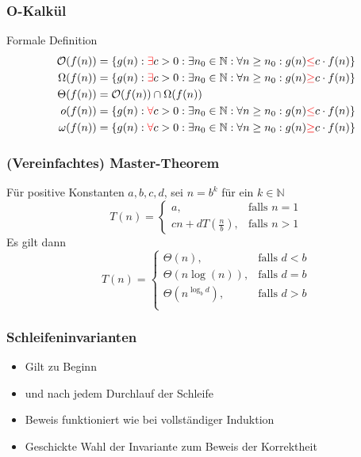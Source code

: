 \begin{frame}
	\frametitle{O-Kalkül}
	\begin{block}{Formale Definition}
		\begin{align*}
			\mathcal{O}(f(n)) &= \{g(n):{\color{red}\exists} c > 0: \exists n_0 \in \mathbb{N}: \forall n \ge n_0: g(n) {\color{red}\le} c \cdot f(n)\}\\
			\Omega(f(n)) &= \{g(n):{\color{red}\exists} c > 0: \exists n_0 \in \mathbb{N}: \forall n \ge n_0: g(n) {\color{red}\ge} c \cdot f(n)\}\\
			\Theta(f(n)) &= \mathcal{O}(f(n)) \cap \Omega(f(n))\\
			o(f(n)) &= \{g(n):{\color{red}\forall} c > 0: \exists n_0 \in \mathbb{N}: \forall n \ge n_0: g(n) {\color{red}\le} c \cdot f(n)\}\\
			\omega(f(n)) &= \{g(n):{\color{red}\forall} c > 0: \exists n_0 \in \mathbb{N}: \forall n \ge n_0: g(n) {\color{red}\ge} c \cdot f(n)\}\\
		\end{align*}
	\end{block}
\end{frame}



\begin{frame}
	\frametitle{(Vereinfachtes) Master-Theorem}
	\begin{center}
		Für positive Konstanten $a, b, c, d$, sei $n = b^k$ für ein $k \in \mathbb{N}$
			$$
				T(n) = \begin{cases}
					a, &\text{falls } n = 1\\
					c n + d T(\frac{n}{b}), &\text{falls } n > 1
				\end{cases}
			$$
		Es gilt dann
			$$
				T(n) = \begin{cases}
					\Theta(n), &\text{falls } d < b\\
					\Theta(n \log(n)), &\text{falls } d = b\\
					\Theta(n^{\log_b{d}}), &\text{falls } d > b\\
				\end{cases}
			$$
	\end{center}
\end{frame}


\begin{frame}
	\frametitle{Schleifeninvarianten}
	\begin{itemize}
		\item Gilt zu Beginn
		\item und nach jedem Durchlauf der Schleife
		\item Beweis funktioniert wie bei vollständiger Induktion
		\item Geschickte Wahl der Invariante zum Beweis der Korrektheit
	\end{itemize}
\end{frame}

